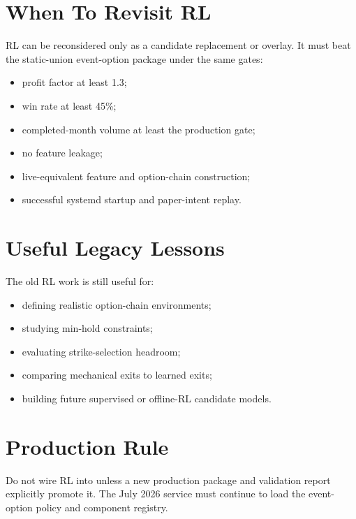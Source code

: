 \documentclass[11pt,a4paper]{article}
\begin{document}
\section{When To Revisit RL}

RL can be reconsidered only as a candidate replacement or overlay. It must beat the static-union event-option package under the same gates:

\begin{itemize}
  \item profit factor at least 1.3;
  \item win rate at least 45\%;
  \item completed-month volume at least the production gate;
  \item no feature leakage;
  \item live-equivalent feature and option-chain construction;
  \item successful systemd startup and paper-intent replay.
\end{itemize}

\section{Useful Legacy Lessons}

The old RL work is still useful for:

\begin{itemize}
  \item defining realistic option-chain environments;
  \item studying min-hold constraints;
  \item evaluating strike-selection headroom;
  \item comparing mechanical exits to learned exits;
  \item building future supervised or offline-RL candidate models.
\end{itemize}

\section{Production Rule}

Do not wire RL into  unless a new production package and validation report explicitly promote it. The July 2026 service must continue to load the event-option policy and component registry.
\end{document}
